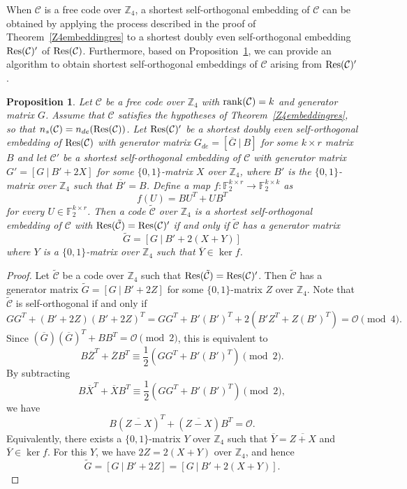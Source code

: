 \documentclass{article}
\newtheorem{proposition}[theorem]{Proposition}
\theoremstyle{definition}
\theoremstyle{remark}
\begin{document}
When $\mathcal{C}$ is a free code over $\mathbb{Z}_4$, a shortest self-orthogonal embedding of $\mathcal{C}$ can be obtained by applying the process described in the proof of Theorem~\ref{Z4embeddingres} to a shortest doubly even self-orthogonal embedding ${\rm Res}(\mathcal{C})'$ of ${\rm Res}(\mathcal{C})$. Furthermore, based on Proposition~\ref{z4lift}, we can provide an algorithm to obtain shortest self-orthogonal embeddings of $\mathcal{C}$ arising from ${\rm Res}(\mathcal{C})'$.

\begin{proposition}\label{z4lift}
    Let $\mathcal{C}$ be a free code over $\mathbb{Z}_4$ with ${\rm rank}(\mathcal{C})=k$ and generator matrix $G$. Assume that $\mathcal{C}$ satisfies the hypotheses of Theorem~\ref{Z4embeddingres}, so that $n_{s}(\mathcal{C})=n_{de}({\rm Res}(\mathcal{C}))$. Let ${\rm Res}(\mathcal{C})'$ be a shortest doubly even self-orthogonal embedding of ${\rm Res}(\mathcal{C})$ with generator matrix $G_{de}=[\overline{G}~|~B]$ for some $k\times r$ matrix $B$ and let $\mathcal{C}'$ be a shortest self-orthogonal embedding of $\mathcal{C}$ with generator matrix $G'=[G~|~B'+2X]$ for some $\{0, 1\}$-matrix $X$ over $\mathbb{Z}_4$, where $B'$ is the $\{0,1\}$-matrix over $\mathbb Z_4$ such that $\overline{B'}=B$. Define a map $f:\mathbb{F}_2^{k\times r}\to \mathbb{F}_2^{k\times k}$ as 
    \[
    f(U)=BU^T+UB^T
    \]
    for every $U\in\mathbb{F}_2^{k\times r}$. Then a code $\tilde{\mathcal{C}}$ over $\mathbb{Z}_4$ is a shortest self-orthogonal embedding of $\mathcal{C}$ with ${\rm Res}(\tilde{\mathcal{C}})={\rm Res}(\mathcal{C})'$ if and only if $\tilde{\mathcal{C}}$ has a generator matrix
    \[
    \tilde{G}=[G~|~B'+2(X+Y)]
    \]
    where $Y$ is a $\{0,1\}$-matrix over $\mathbb Z_4$ such that $\overline{Y}\in\ker f$.
\end{proposition}
\begin{proof}
    Let $\tilde{\mathcal{C}}$ be a code over $\mathbb{Z}_4$ such that ${\rm Res}(\tilde{\mathcal{C}})={\rm Res}(\mathcal{C})'$. Then $\tilde{\mathcal{C}}$ has a generator matrix $\tilde{G}=[G~|~B'+2Z]$ for some $\{0, 1\}$-matrix $Z$ over $\mathbb{Z}_4$. Note that $\tilde{\mathcal{C}}$ is self-orthogonal if and only if \[
    GG^T+(B'+2Z)(B'+2Z)^T=GG^T+B'(B')^T+2(B'Z^T+Z(B')^T)=\mathcal{O}\pmod 4.
    \]
    Since $(\overline{G})(\overline{G})^T+BB^T=\mathcal{O}\pmod 2$, this is equivalent to
    \[
    B\overline{Z}^T+\overline{Z}B^T\equiv\frac{1}{2}(GG^T+B'(B')^T)\pmod 2.
    \]
    By subtracting
    \[
    B\overline{X}^T+\overline{X}B^T\equiv\frac{1}{2}(GG^T+B'(B')^T)\pmod 2,
    \]
    we have
    \[
    B(\overline{Z-X})^T+(\overline{Z-X})B^T=\mathcal O.
    \]
    Equivalently, there exists a $\{0,1\}$-matrix $Y$ over $\mathbb Z_4$ such that $\overline{Y}=\overline{Z+X}$ and $\overline{Y}\in\ker f$. For this $Y$, we have $2Z=2(X+Y)$ over $\mathbb Z_4$, and hence
\[
\tilde{G}=[G~|~B'+2Z]=[G~|~B'+2(X+Y)].
\]
\end{proof}
\end{document}
